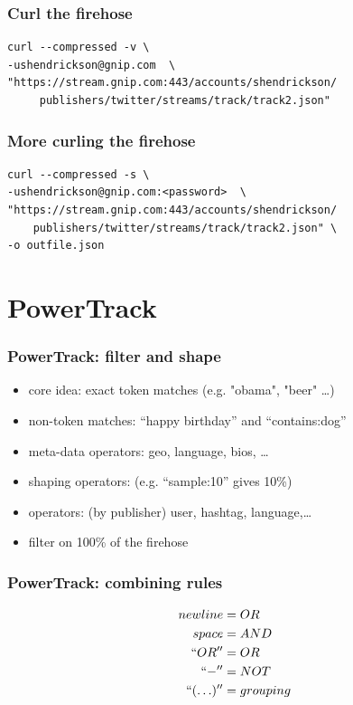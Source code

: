 \documentclass{beamer}
\begin{document}
{
\begin{frame}[fragile]
\Huge{\color{black}\secname{}}
\end{frame}
}

\begin{frame}[fragile]
\frametitle{Curl the firehose}
\begin{verbatim}
curl --compressed -v \
-ushendrickson@gnip.com  \
"https://stream.gnip.com:443/accounts/shendrickson/
     publishers/twitter/streams/track/track2.json"
\end{verbatim}
\end{frame}

\begin{frame}[fragile]
\frametitle{More curling the firehose}
\begin{verbatim}
curl --compressed -s \
-ushendrickson@gnip.com:<password>  \
"https://stream.gnip.com:443/accounts/shendrickson/
    publishers/twitter/streams/track/track2.json" \
-o outfile.json
\end{verbatim}
\end{frame}

\section{PowerTrack}

\begin{frame}\frametitle{PowerTrack: filter and shape}
\begin{itemize}
\item core idea: exact token matches (e.g. "obama", "beer" \ldots)
\item non-token matches: ``happy birthday'' and ``contains:dog''
\item meta-data operators: geo, language, bios, \ldots
\item shaping operators: (e.g. ``sample:10'' gives 10\%)
\item operators: (by publisher) user, hashtag, language,\ldots
\item filter on 100\% of the firehose
\end{itemize}
\end{frame}


\begin{frame}\frametitle{PowerTrack: combining rules}
\begin{equation*}
\begin{aligned}
        newline &= OR \\
        space &= AND \\
        ``OR'' &= OR \\
        ``-'' &= NOT \\
        ``(\ldots)'' &= grouping
\end{aligned}
\end{equation*}
\end{frame}
\end{document}
